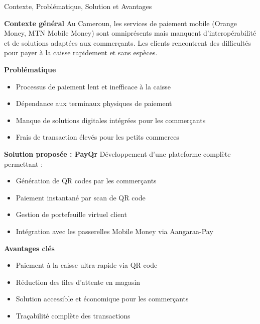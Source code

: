 \documentclass[aspectratio=169,9pt,demo]{beamer}
\begin{document}
\begin{frame}{Contexte, Problématique, Solution et Avantages}
\begin{block}{\textbf{Contexte général}}
Au Cameroun, les services de paiement mobile (Orange Money, MTN Mobile Money) sont omniprésents mais manquent d'interopérabilité et de solutions adaptées aux commerçants. Les clients rencontrent des difficultés pour payer à la caisse rapidement et sans espèces.
\end{block}

\begin{block}{\textbf{Problématique}}
\begin{itemize}
    \item Processus de paiement lent et inefficace à la caisse
    \item Dépendance aux terminaux physiques de paiement
    \item Manque de solutions digitales intégrées pour les commerçants
    \item Frais de transaction élevés pour les petits commerces
\end{itemize}
\end{block}

\begin{block}{\textbf{Solution proposée : PayQr}}
Développement d'une plateforme complète permettant :
\begin{itemize}
    \item Génération de QR codes par les commerçants
    \item Paiement instantané par scan de QR code
    \item Gestion de portefeuille virtuel client
    \item Intégration avec les passerelles Mobile Money via Aangaraa-Pay
\end{itemize}
\end{block}

\begin{block}{\textbf{Avantages clés}}
\begin{itemize}
    \item Paiement à la caisse ultra-rapide via QR code
    \item Réduction des files d'attente en magasin
    \item Solution accessible et économique pour les commerçants
    \item Traçabilité complète des transactions
\end{itemize}
\end{block}
\end{frame}
\end{document}
